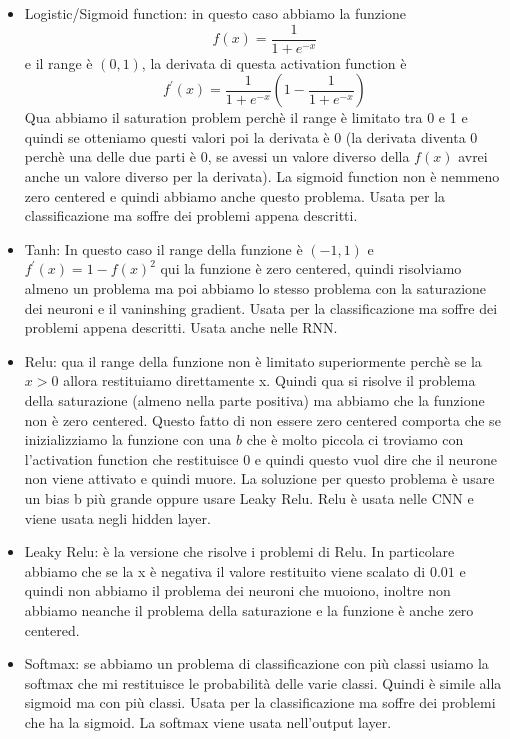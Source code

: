 \documentclass[14pt]{extreport}
\begin{document}
\begin{itemize}
	\item Logistic/Sigmoid function: in questo caso abbiamo la funzione $$f(x) = \frac{1}{1+e^{-x}}$$ e il range è $(0,1)$, la derivata di questa
	      activation function è $$f^{'}(x) = \frac{1}{1+e^{-x}}(1-\frac{1}{1+e^{-x}})$$ Qua abbiamo il saturation problem perchè il range è limitato
	      tra 0 e 1 e quindi se otteniamo questi valori poi la derivata è 0 (la derivata diventa 0 perchè una delle due parti è 0, se avessi un valore
	      diverso della $f(x)$ avrei anche un valore diverso per la derivata). La sigmoid function non è nemmeno zero centered e quindi abbiamo anche
	      questo problema. Usata per la classificazione ma soffre dei problemi appena descritti.
	\item Tanh: In questo caso il range della funzione è $(-1,1)$ e $f^{'}(x) = 1 - f(x)^2$ qui la funzione è zero centered, quindi risolviamo almeno
	      un problema ma poi abbiamo lo stesso problema con la saturazione dei neuroni e il vaninshing gradient. Usata per la classificazione ma
	      soffre dei problemi appena descritti. Usata anche nelle RNN.
	\item Relu: qua il range della funzione non è limitato superiormente perchè se la $x>0$ allora restituiamo direttamente x. Quindi qua si risolve
	      il problema della saturazione (almeno nella parte positiva) ma abbiamo che la funzione non è zero centered. Questo fatto di non essere zero
	      centered comporta che se inizializziamo la funzione con una $b$ che è molto piccola ci troviamo con l'activation function che restituisce 0
	      e quindi questo vuol dire che il neurone non viene attivato e quindi muore. La soluzione per questo problema è usare un bias b più grande
	      oppure usare Leaky Relu. Relu è usata nelle CNN e viene usata negli hidden layer.
	\item Leaky Relu: è la versione che risolve i problemi di Relu. In particolare abbiamo che se la x è negativa il valore restituito viene scalato
	      di $0.01$ e quindi non abbiamo il problema dei neuroni che muoiono, inoltre non abbiamo neanche il problema della saturazione e la funzione
	      è anche zero centered.
	\item Softmax: se abbiamo un problema di classificazione con più classi usiamo la softmax che mi restituisce le probabilità delle varie classi.
	      Quindi è simile alla sigmoid ma con più classi. Usata per la classificazione ma soffre dei problemi che ha la sigmoid. La softmax viene
	      usata nell'output layer.
\end{itemize}
\end{document}
